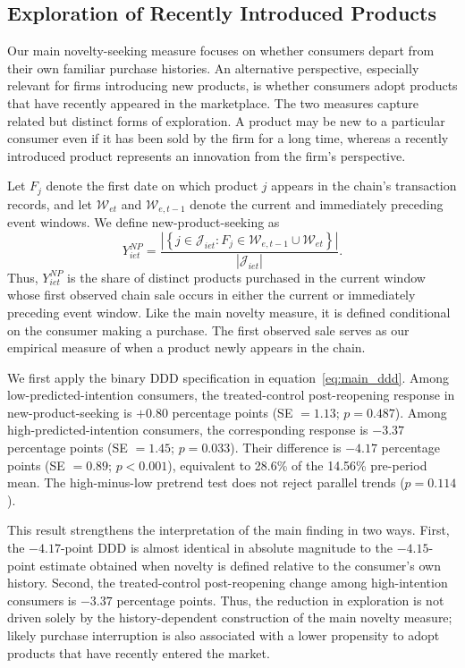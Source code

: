\documentclass[11 pt]{article}
\begin{document}
\subsection{Exploration of Recently Introduced Products}
\label{section:robustness_new_product}

Our main novelty-seeking measure focuses on whether consumers depart from their own familiar purchase histories. An alternative perspective, especially relevant for firms introducing new products, is whether consumers adopt products that have recently appeared in the marketplace. The two measures capture related but distinct forms of exploration. A product may be new to a particular consumer even if it has been sold by the firm for a long time, whereas a recently introduced product represents an innovation from the firm's perspective.

Let $F_j$ denote the first date on which product $j$ appears in the chain's transaction records, and let $\mathcal{W}_{et}$ and $\mathcal{W}_{e,t-1}$ denote the current and immediately preceding event windows. We define new-product-seeking as
\begin{equation}
Y^{NP}_{iet}
=
\frac{
\left|
\left\{
j\in\mathcal{J}_{iet}:
F_j\in\mathcal{W}_{e,t-1}\cup\mathcal{W}_{et}
\right\}
\right|
}{
|\mathcal{J}_{iet}|
}.
\label{eq:new_product_maintext}
\end{equation}
Thus, $Y^{NP}_{iet}$ is the share of distinct products purchased in the current window whose first observed chain sale occurs in either the current or immediately preceding event window. Like the main novelty measure, it is defined conditional on the consumer making a purchase. The first observed sale serves as our empirical measure of when a product newly appears in the chain.

We first apply the binary DDD specification in equation~\eqref{eq:main_ddd}. Among low-predicted-intention consumers, the treated-control post-reopening response in new-product-seeking is $+0.80$ percentage points (SE $=1.13$; $p=0.487$). Among high-predicted-intention consumers, the corresponding response is $-3.37$ percentage points (SE $=1.45$; $p=0.033$). Their difference is $-4.17$ percentage points (SE $=0.89$; $p<0.001$), equivalent to 28.6\% of the 14.56\% pre-period mean. The high-minus-low pretrend test does not reject parallel trends ($p=0.114$).

This result strengthens the interpretation of the main finding in two ways. First, the $-4.17$-point DDD is almost identical in absolute magnitude to the $-4.15$-point estimate obtained when novelty is defined relative to the consumer's own history. Second, the treated-control post-reopening change among high-intention consumers is $-3.37$ percentage points. Thus, the reduction in exploration is not driven solely by the history-dependent construction of the main novelty measure; likely purchase interruption is also associated with a lower propensity to adopt products that have recently entered the market.
\end{document}
